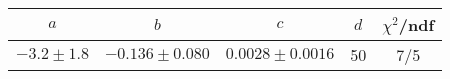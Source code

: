 \begin{tabular}{c|c|c|c|c}
$a$ & $b$ & $c$ & $d$ & $\chi^2$/ndf \\
\hline
$-3.2\pm1.8$ & $-0.136\pm0.080$ & $0.0028\pm0.0016$ & 50 & 7/5
\end{tabular}
